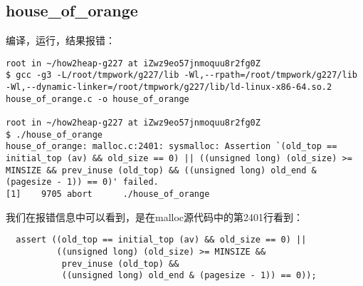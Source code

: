 \subsection{house\_of\_orange}

编译，运行，结果报错：
\begin{verbatim}
root in ~/how2heap-g227 at iZwz9eo57jnmoquu8r2fg0Z 
$ gcc -g3 -L/root/tmpwork/g227/lib -Wl,--rpath=/root/tmpwork/g227/lib -Wl,--dynamic-linker=/root/tmpwork/g227/lib/ld-linux-x86-64.so.2 house_of_orange.c -o house_of_orange      

root in ~/how2heap-g227 at iZwz9eo57jnmoquu8r2fg0Z 
$ ./house_of_orange   
house_of_orange: malloc.c:2401: sysmalloc: Assertion `(old_top == initial_top (av) && old_size == 0) || ((unsigned long) (old_size) >= MINSIZE && prev_inuse (old_top) && ((unsigned long) old_end & (pagesize - 1)) == 0)' failed.
[1]    9705 abort      ./house_of_orange

\end{verbatim}

我们在报错信息中可以看到，是在malloc源代码中的第2401行看到：
\begin{verbatim}
  assert ((old_top == initial_top (av) && old_size == 0) ||
          ((unsigned long) (old_size) >= MINSIZE &&
           prev_inuse (old_top) &&
           ((unsigned long) old_end & (pagesize - 1)) == 0));
\end{verbatim}

